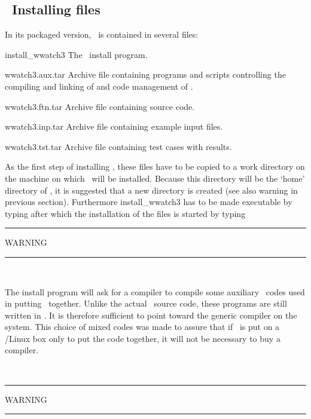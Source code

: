 \vssub
\subsection{~Installing files}\label{sec:install}
\vssub

\noindent
In its packaged version, \ws\ is contained in several files:

\begin{list}{???}{\parsep 0mm \itemsep 0mm 
                  \leftmargin 40mm \rightmargin 5mm
                   }
\item[{\file install\_wwatch3} \hfill]
The \ws\ install program. 
\item[{\file wwatch3.aux.tar} \hfill] Archive file containing programs and
scripts controlling the compiling and linking of and code management of \ws.
\item[{\file wwatch3.ftn.tar} \hfill]
Archive file containing source code.
\item[{\file wwatch3.inp.tar} \hfill]
Archive file containing example input files. 
\item[{\file wwatch3.tst.tar} \hfill]
Archive file containing test cases with results. 
\end{list}

\noindent
As the first step of installing \ws, these files have to be copied to a work
directory on the machine on which \ws\ will be installed. Because this
directory will be the `home' directory of \ws, it is suggested that a new
directory is created (see also warning in previous section). Furthermore
{\file install\_wwatch3} has to be made executable by typing  after which the installation of the files is started by
typing 


\begin{center}
\rule[1mm]{55mm}{1.0mm} WARNING \rule[1mm]{55mm}{1.0mm} \\ 
\vspace{\baselineskip}
\parbox{120mm}{The install program will ask for a compiler to compile some
auxiliary \fortran\ codes used in putting \ws\ together. Unlike the actual
\ws\ source code, these programs are still written in . It is
therefore sufficient to point toward the generic  compiler on the
system. This choice of mixed codes was made to assure that if \ws\ is put on a
\unix/Linux box only to put the code together, it will not be necessary to buy
a  compiler.} \\ \vspace{\baselineskip} \rule[1mm]{55mm}{1.0mm}
WARNING \rule[1mm]{55mm}{1.0mm}
\end{center}

